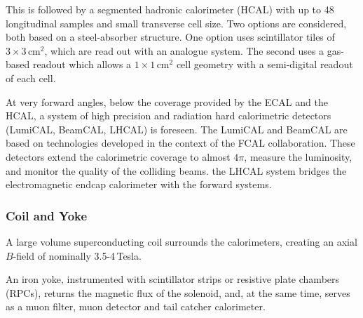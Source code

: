 

This is followed by a segmented hadronic calorimeter (HCAL) with up to 48 longitudinal samples and small transverse cell size. Two 
options are considered, both based on a steel-absorber structure. One option uses scintillator tiles of $3 \times 3$\,cm$^2$, 
which are read out with an analogue system. The second uses a gas-based readout which allows a $1 \times 1$\,cm$^2$ 
cell geometry with a semi-digital readout of each cell. 

At very forward angles, below the coverage provided by the ECAL and
the HCAL, a system of high precision and radiation hard calorimetric
detectors (LumiCAL, BeamCAL, LHCAL)
 is foreseen. The LumiCAL and BeamCAL are based on technologies developed in the context of the FCAL collaboration. These detectors 
extend the calorimetric coverage to almost $4\pi$, measure the
luminosity, and  monitor
 the quality of the colliding beams. the LHCAL system bridges the electromagnetic endcap calorimeter with the forward systems. 

\subsubsection{Coil and Yoke}
A large volume superconducting coil surrounds the calorimeters, creating an axial $B$-field of nominally 3.5-4\,Tesla.

An iron  yoke, instrumented with scintillator strips or resistive
plate chambers (RPCs), returns the magnetic flux of the solenoid, and,
at the same
 time, serves as a muon filter, muon detector and tail catcher calorimeter.

